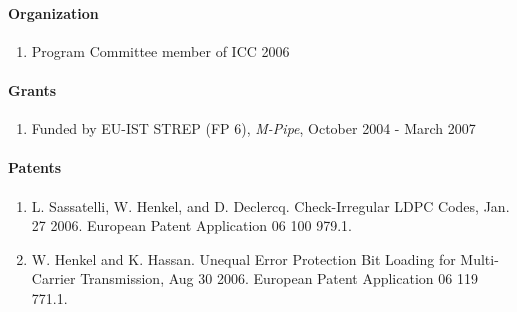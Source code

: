 \newpage
\paragraph{Organization}

\begin{enumerate}
\item Program Committee member of ICC 2006
\end{enumerate}


\paragraph{Grants}
\begin{enumerate}
\item Funded by EU-IST STREP (FP 6), \emph{M-Pipe},  October 2004
- March 2007
\end{enumerate}

\paragraph{Patents}
\begin{enumerate}
\item  L. Sassatelli, W. Henkel, and D. Declercq. Check-Irregular LDPC Codes, Jan. 27
  2006. European Patent Application 06 100 979.1.
\item W. Henkel and K. Hassan. Unequal Error Protection Bit Loading for Multi-Carrier
  Transmission, Aug 30 2006. European Patent Application 06 119 771.1.
\end{enumerate}



